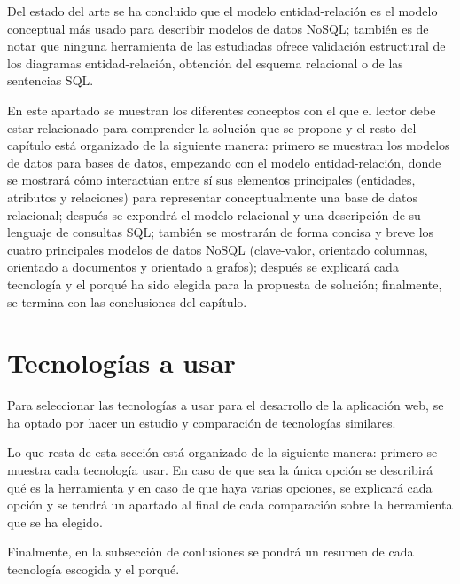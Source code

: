 
Del estado del arte se ha concluido que el modelo entidad-relación es el modelo conceptual más usado para describir modelos de datos NoSQL; también es de notar que ninguna herramienta de las estudiadas ofrece validación estructural de los diagramas entidad-relación, obtención del esquema relacional o de las sentencias SQL.


En este apartado se muestran los diferentes conceptos con el que el lector debe estar relacionado para comprender la solución que se propone y el resto del capítulo está organizado de la siguiente manera: primero se muestran los modelos de datos para bases de datos, empezando con el modelo entidad-relación, donde se mostrará cómo interactúan entre sí sus elementos principales (entidades, atributos y relaciones) para representar conceptualmente una base de datos relacional; después se expondrá el modelo relacional y una descripción de su lenguaje de consultas SQL; también se mostrarán de forma concisa y breve los cuatro principales modelos de datos NoSQL (clave-valor, orientado columnas, orientado a documentos y orientado a grafos); después se explicará cada tecnología y el porqué ha sido elegida para la propuesta de solución; finalmente, se termina con las conclusiones del capítulo.



 

 






\section{Tecnologías a usar}
Para seleccionar las tecnologías a usar para el desarrollo de la aplicación web, se ha optado por hacer un estudio y comparación de tecnologías similares.


Lo que resta de esta sección está organizado de la siguiente manera: primero se muestra cada tecnología usar. En caso de que sea la única opción se describirá qué es la herramienta y en caso de que haya varias opciones, se explicará cada opción y se tendrá un apartado al final de cada comparación sobre la herramienta que se ha elegido.


Finalmente, en la subsección de conlusiones se pondrá un resumen de cada tecnología escogida y el porqué.










